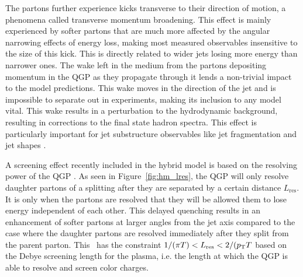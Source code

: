 The partons further experience kicks transverse to their direction of motion, a phenomena called transverse momentum broadening. This effect is mainly experienced by softer partons that are much more affected by the angular narrowing effects of energy loss, making most measured observables insensitive to the size of this kick. This is directly related to wider jets losing more energy than narrower ones. The wake left in the medium from the partons depositing momentum in the QGP as they propagate through it lends a non-trivial impact to the model predictions. This wake moves in the direction of the jet and is impossible to separate out in experiments, making its inclusion to any model vital. This wake results in a perturbation to the hydrodynamic background, resulting in corrections to the final state hadron spectra. This effect is particularly important for jet substructure observables like jet fragmentation and jet shapes \cite{Casalderrey-Solana:2016jvj}.

A screening effect recently included in the hybrid model is based on the resolving power of the QGP \cite{Hulcher:2017cpt}. As seen in Figure~\ref{fig:hm_lres}, the QGP will only resolve daughter partons of a splitting after they are separated by a certain distance $L_\mathrm{res}$. It is only when the partons are resolved that they will be allowed them to lose energy independent of each other. This delayed quenching results in an enhancement of softer partons at larger angles from the jet axis compared to the case where the daughter partons are resolved immediately after they split from the parent parton. This \Lres\ has the constraint $ 1/(\pi T) < \mbox{$L_{\mathrm{res}}$} < 2 /(\mbox{$p_{\mathrm{T}}$} T$ based on the Debye screening length for the plasma, i.e. the length at which the QGP is able to resolve and screen color charges.


